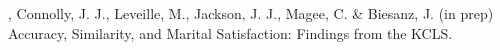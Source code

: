 \item \meb, Connolly, J. J., Leveille, M., Jackson, J. J., Magee, C. \& Biesanz, J. (in prep) Accuracy, Similarity, and Marital Satisfaction: Findings from the KCLS.
\vspace{-2mm}\begin{center}\end{center} \vspace{-4mm}